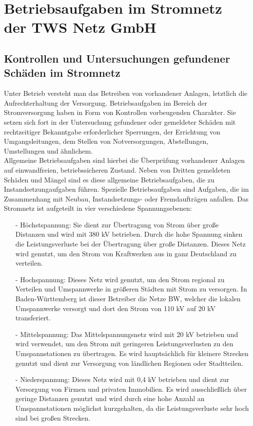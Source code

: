 \chapter{Betriebsaufgaben im Stromnetz der TWS Netz GmbH}
\label{cha:Betriebsaufgaben}

\section{Kontrollen und Untersuchungen gefundener Schäden im Stromnetz}

Unter Betrieb versteht man das Betreiben von vorhandener Anlagen, letztlich die Aufrechterhaltung der Versorgung. 
Betriebsaufgaben im Bereich der Stromversorgung haben in Form von Kontrollen vorbeugenden Charakter. Sie setzen sich fort in der Untersuchung gefundener 
oder gemeldeter Schäden mit rechtzeitiger Bekanntgabe erforderlicher Sperrungen, der Errichtung von Umgangsleitungen, dem Stellen von Notversorgungen, 
Abstellungen, Umstellungen und ähnlichem.
\\
Allgemeine Betriebsaufgaben sind hierbei die Überprüfung vorhandener Anlagen auf einwandfreien, betriebssicheren Zustand. Neben von Dritten gemeldeten Schäden
und Mängel sind es diese allgemeine Betriebsaufgaben, die zu Instandsetzungaufgaben führen. Spezielle Betriebsaufgaben sind Aufgaben, die im Zusammenhang 
mit Neubau, Instandsetzungs- oder Fremdaufträgen anfallen. Das Stromnetz ist aufgeteilt in vier verschiedene Spannungsebenen: 
\begin{itemize}
    \item[-] Höchstspannung: Sie dient zur Übertragung von Strom über große Distanzen und wird mit 380 kV betrieben. Durch die hohe Spannung sinken die 
    Leistungsverluste bei der Übertragung über große Distanzen. Dieses Netz wird genutzt, um den Strom von Kraftwerken aus in ganz Deutschland zu verteilen.
    \item[-] Hochspannung: Dieses Netz wird genutzt, um den Strom regional zu Verteilen und Umspannwerke in größeren Städten mit Strom zu versorgen. 
    In Baden-Württemberg ist dieser Betreiber die Netze BW, welcher die lokalen Umspannwerke versorgt und dort den Strom von 110 kV auf 20 kV transferiert.
    \clearpage
    \item[-] Mittelspannung: Das Mittelspannungsnetz wird mit 20 kV betrieben und wird verwendet, um den Strom mit geringeren Leistungsverlusten zu den 
    Umspannstationen zu übertragen. Es wird hauptsächlich für kleinere Strecken genutzt und dient zur Versorgung von ländlichen Regionen oder Stadtteilen.
    \item[-] Niederspannung: Dieses Netz wird mit 0,4 kV betrieben und dient zur Versorgung von Firmen und privaten Immobilien. Es wird ausschließlich über 
    geringe Distanzen genutzt und wird durch eine hohe Anzahl an Umspannstationen möglichst kurzgehalten, da die Leistungsverluste sehr hoch sind bei großen
    Strecken.
\end{itemize}
